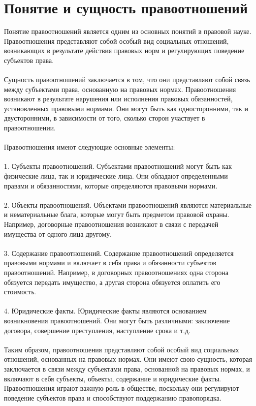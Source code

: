 \documentclass{article}
\begin{document}
\section{Понятие и сущность правоотношений}
Понятие правоотношений является одним из основных понятий в правовой науке. Правоотношения представляют собой особый вид социальных отношений, возникающих в результате действия правовых норм и регулирующих поведение субъектов права.\\
~\\
Сущность правоотношений заключается в том, что они представляют собой связь между субъектами права, основанную на правовых нормах. Правоотношения возникают в результате нарушения или исполнения правовых обязанностей, установленных правовыми нормами. Они могут быть как односторонними, так и двусторонними, в зависимости от того, сколько сторон участвует в правоотношении.\\
~\\
Правоотношения имеют следующие основные элементы:\\
~\\
1. Субъекты правоотношений. Субъектами правоотношений могут быть как физические лица, так и юридические лица. Они обладают определенными правами и обязанностями, которые определяются правовыми нормами.\\
~\\
2. Объекты правоотношений. Объектами правоотношений являются материальные и нематериальные блага, которые могут быть предметом правовой охраны. Например, договорные правоотношения возникают в связи с передачей имущества от одного лица другому.\\
~\\
3. Содержание правоотношений. Содержание правоотношений определяется правовыми нормами и включает в себя права и обязанности субъектов правоотношений. Например, в договорных правоотношениях одна сторона обязуется передать имущество, а другая сторона обязуется оплатить его стоимость.\\
~\\
4. Юридические факты. Юридические факты являются основанием возникновения правоотношений. Они могут быть различными: заключение договора, совершение преступления, наступление срока и т.д.\\
~\\
Таким образом, правоотношения представляют собой особый вид социальных отношений, основанных на правовых нормах. Они имеют свою сущность, которая заключается в связи между субъектами права, основанной на правовых нормах, и включают в себя субъекты, объекты, содержание и юридические факты. Правоотношения играют важную роль в обществе, поскольку они регулируют поведение субъектов права и способствуют поддержанию правопорядка.
\end{document}
